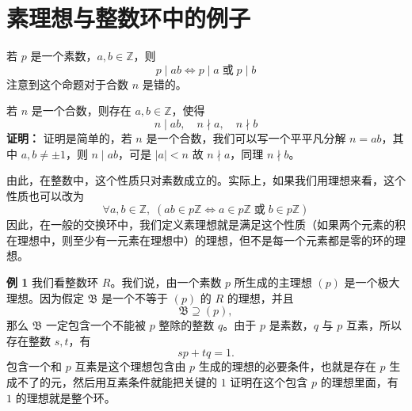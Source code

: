 \section{素理想与整数环中的例子}

\begin{lemma}[引理 2.7：素数的性质]
若 $p$ 是一个素数，$a,b\in\mathbb{Z}$，则
\[
p\mid ab\iff p\mid a\;\text{或}\;p\mid b
\]
注意到这个命题对于合数 $n$ 是错的。
\end{lemma}

\begin{lemma}[引理 2.8：合数的性质]
若 $n$ 是一个合数，则存在 $a,b\in\mathbb{Z}$，使得
\[
n\mid ab,\quad n\nmid a,\quad n\nmid b
\]
\textbf{证明：} 证明是简单的，若 $n$ 是一个合数，我们可以写一个平平凡分解 $n=ab$，其中 $a,b\ne\pm1$，则 $n\mid ab$，可是 $|a|<n$ 故 $n\nmid a$，同理 $n\nmid b$。

由此，在整数中，这个性质只对素数成立的。实际上，如果我们用理想来看，这个性质也可以改为
\[
\forall a,b\in\mathbb{Z},\;(ab\in p\mathbb{Z}\iff a\in p\mathbb{Z}\;\text{或}\;b\in p\mathbb{Z})
\]
因此，在一般的交换环中，我们定义素理想就是满足这个性质（如果两个元素的积在理想中，则至少有一元素在理想中）的理想，但不是每一个元素都是零的环的理想。
\end{lemma}

\begin{example}
\textbf{例 1} \quad 我们看整数环 $R$。我们说，由一个素数 $p$ 所生成的主理想 $(p)$ 是一个极大理想。因为假定 $\mathfrak{B}$ 是一个不等于 $(p)$ 的 $R$ 的理想，并且
\[
\mathfrak{B}\supseteq(p),
\]
那么 $\mathfrak{B}$ 一定包含一个不能被 $p$ 整除的整数 $q$。由于 $p$ 是素数，$q$ 与 $p$ 互素，所以存在整数 $s,t$，有
\[
sp+tq=1.
\]
包含一个和 $p$ 互素是这个理想包含由 $p$ 生成的理想的必要条件，也就是存在 $p$ 生成不了的元，然后用互素条件就能把关键的 $1$ 证明在这个包含 $p$ 的理想里面，有 $1$ 的理想就是整个环。
\end{example}
